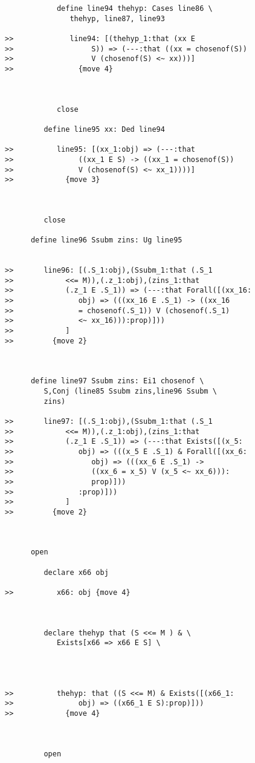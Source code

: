 \documentclass[12pt]{article}
\begin{document}
\begin{verbatim}
            define line94 thehyp: Cases line86 \
               thehyp, line87, line93

>>             line94: [(thehyp_1:that (xx E
>>                  S)) => (---:that ((xx = chosenof(S))
>>                  V (chosenof(S) <~ xx)))]
>>               {move 4}



            close

         define line95 xx: Ded line94

>>          line95: [(xx_1:obj) => (---:that
>>               ((xx_1 E S) -> ((xx_1 = chosenof(S))
>>               V (chosenof(S) <~ xx_1))))]
>>            {move 3}



         close

      define line96 Ssubm zins: Ug line95


>>       line96: [(.S_1:obj),(Ssubm_1:that (.S_1
>>            <<= M)),(.z_1:obj),(zins_1:that
>>            (.z_1 E .S_1)) => (---:that Forall([(xx_16:
>>               obj) => (((xx_16 E .S_1) -> ((xx_16
>>               = chosenof(.S_1)) V (chosenof(.S_1)
>>               <~ xx_16))):prop)]))
>>            ]
>>         {move 2}



      define line97 Ssubm zins: Ei1 chosenof \
         S,Conj (line85 Ssubm zins,line96 Ssubm \
         zins)

>>       line97: [(.S_1:obj),(Ssubm_1:that (.S_1
>>            <<= M)),(.z_1:obj),(zins_1:that
>>            (.z_1 E .S_1)) => (---:that Exists([(x_5:
>>               obj) => (((x_5 E .S_1) & Forall([(xx_6:
>>                  obj) => (((xx_6 E .S_1) ->
>>                  ((xx_6 = x_5) V (x_5 <~ xx_6))):
>>                  prop)]))
>>               :prop)]))
>>            ]
>>         {move 2}



      open

         declare x66 obj

>>          x66: obj {move 4}



         declare thehyp that (S <<= M ) & \
            Exists[x66 => x66 E S] \
            



>>          thehyp: that ((S <<= M) & Exists([(x66_1:
>>               obj) => ((x66_1 E S):prop)]))
>>            {move 4}



         open


\end{verbatim}
\end{document}
